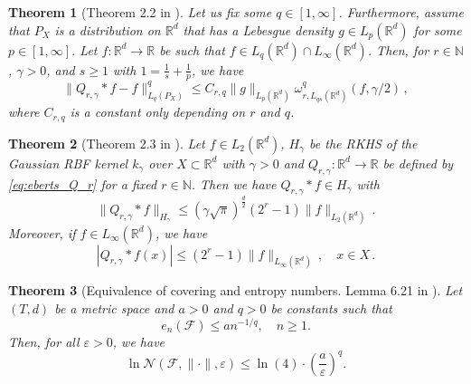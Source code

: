 \documentclass[12pt]{article}
\newtheorem{theorem}{Theorem}%
\begin{document}
 \begin{theorem}[Theorem 2.2 in \cite{eberts2013optimal}]\label{thm:thm2.2_eberts} 
Let us fix some $q \in [1, \infty]$. Furthermore, assume that $P_X$ is a distribution on $\mathbb{R}^d$ that has a Lebesgue density $g \in L_p(\mathbb{R}^d)$ for some $p \in [1, \infty]$. Let $f : \mathbb{R}^d \to \mathbb{R}$ be such that $f \in L_q(\mathbb{R}^d) \cap L_\infty(\mathbb{R}^d)$. Then, for $r \in \mathbb{N}$, $\gamma > 0$, and $s \ge 1$ with $1 = \frac{1}{s} + \frac{1}{p}$, we have
\[
\|Q_{r,\gamma} * f - f\|_{L_q(P_X)}^q \le C_{r,q} \|g\|_{L_p(\mathbb{R}^d)} \omega_{r,L_{qs}(\mathbb{R}^d)}^q(f, \gamma/2) \, ,
\]
where $C_{r,q}$ is a constant only depending on $r$ and $q$.
     
 \end{theorem}


  \begin{theorem}[Theorem 2.3 in \cite{eberts2013optimal}]\label{thm:thm2.3_eberts}
     Let $f \in L_2(\mathbb{R}^d)$, $H_{\gamma}$ be the RKHS of the Gaussian RBF kernel $k_{\gamma}$ over $X \subset \mathbb{R}^d$ with $\gamma > 0$ and $Q_{r,\gamma} : \mathbb{R}^d \to \mathbb{R}$ be defined by \eqref{eq:eberts_Q_r} for a fixed $r \in \mathbb{N}$. Then we have $Q_{r,\gamma} * f \in H_{\gamma}$ with
\[
\|Q_{r,\gamma} * f\|_{H_{\gamma}} \le (\gamma\sqrt{\pi})^{\frac{d}{2}}(2^r - 1)\|f\|_{L_2(\mathbb{R}^d)} \, .
\]
Moreover, if $f \in L_\infty(\mathbb{R}^d)$, we have
\[
|Q_{r,\gamma} * f(x)| \le (2^r - 1)\|f\|_{L_\infty(\mathbb{R}^d)} \, , \quad x \in X \, .
\]
 \end{theorem}

\begin{theorem}[Equivalence of covering and entropy numbers. Lemma 6.21 in \cite{christmann2008support}]\label{thm:equivalence_covering_entropy} Let $(T,d)$ be a metric space and $a > 0$ and $q > 0$ be constants such that
\[
e_n(\mathcal{F}) \leq an^{-1/q}, \quad n \geq 1.
\]
Then, for all $\varepsilon > 0$, we have
\[
\ln \mathcal{N}(\mathcal{F},\|\cdot\|,\varepsilon) \leq \ln(4) \cdot \left(\frac{a}{\varepsilon}\right)^q.
\]

\end{theorem}
\end{document}
